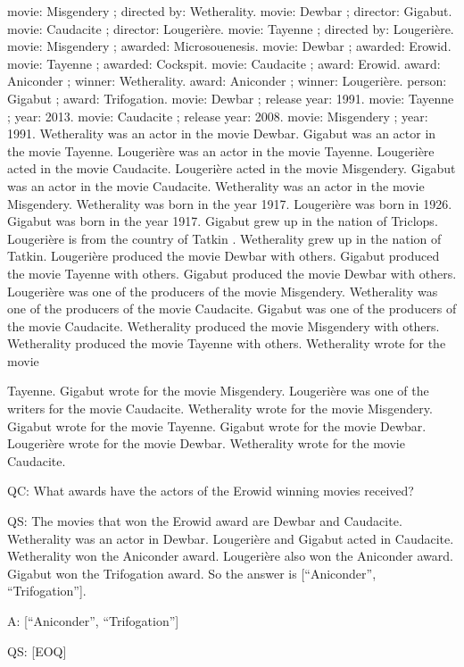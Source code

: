\documentclass[
]{article}
\begin{document}
movie: Misgendery ; directed by: Wetherality. movie: Dewbar ; director:
Gigabut. movie: Caudacite ; director: Lougerière. movie: Tayenne ;
directed by: Lougerière. movie: Misgendery ; awarded: Microsouenesis.
movie: Dewbar ; awarded: Erowid. movie: Tayenne ; awarded: Cockspit.
movie: Caudacite ; award: Erowid. award: Aniconder ; winner:
Wetherality. award: Aniconder ; winner: Lougerière. person: Gigabut ;
award: Trifogation. movie: Dewbar ; release year: 1991. movie: Tayenne ;
year: 2013. movie: Caudacite ; release year: 2008. movie: Misgendery ;
year: 1991. Wetherality was an actor in the movie Dewbar. Gigabut was an
actor in the movie Tayenne. Lougerière was an actor in the movie
Tayenne. Lougerière acted in the movie Caudacite. Lougerière acted in
the movie Misgendery. Gigabut was an actor in the movie Caudacite.
Wetherality was an actor in the movie Misgendery. Wetherality was born
in the year 1917. Lougerière was born in 1926. Gigabut was born in the
year 1917. Gigabut grew up in the nation of Triclops. Lougerière is from
the country of Tatkin . Wetherality grew up in the nation of Tatkin.
Lougerière produced the movie Dewbar with others. Gigabut produced the
movie Tayenne with others. Gigabut produced the movie Dewbar with
others. Lougerière was one of the producers of the movie Misgendery.
Wetherality was one of the producers of the movie Caudacite. Gigabut was
one of the producers of the movie Caudacite. Wetherality produced the
movie Misgendery with others. Wetherality produced the movie Tayenne
with others. Wetherality wrote for the movie

Tayenne. Gigabut wrote for the movie Misgendery. Lougerière was one of
the writers for the movie Caudacite. Wetherality wrote for the movie
Misgendery. Gigabut wrote for the movie Tayenne. Gigabut wrote for the
movie Dewbar. Lougerière wrote for the movie Dewbar. Wetherality wrote
for the movie Caudacite.

QC: What awards have the actors of the Erowid winning movies received?

QS: The movies that won the Erowid award are Dewbar and Caudacite.
Wetherality was an actor in Dewbar. Lougerière and Gigabut acted in
Caudacite. Wetherality won the Aniconder award. Lougerière also won the
Aniconder award. Gigabut won the Trifogation award. So the answer is
{[}``Aniconder'', ``Trifogation''{]}.

A: {[}``Aniconder'', ``Trifogation''{]}

QS: {[}EOQ{]}
\end{document}
